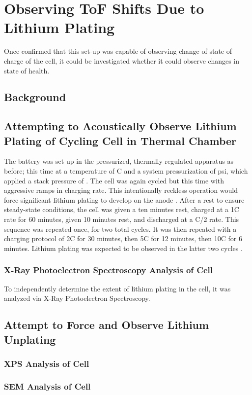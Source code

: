 \section{Observing ToF Shifts Due to Lithium Plating} 
Once confirmed that this set-up was capable of observing change of state of charge of the cell, it could be investigated whether it could observe changes in state of health.

\subsection{Background}

\subsection{Attempting to Acoustically Observe Lithium Plating of Cycling Cell in Thermal Chamber}
The battery was set-up in the pressurized, thermally-regulated apparatus as before; this time at a temperature of  C and a system pressurization of  psi, which applied a stack pressure of . 
The cell was again cycled but this time with aggressive ramps in charging rate. 
This intentionally reckless operation would force significant lithium plating to develop on the anode . 
After a rest to ensure steady-state conditions, the cell was given a ten minutes rest, charged at a 1C rate for 60 minutes, given 10 minutes rest, and discharged at a C/2 rate. 
This sequence was repeated once, for two total cycles. 
It was then repeated with a charging protocol of 2C for 30 minutes, then 5C for 12 minutes, then 10C for 6 minutes. 
Lithium plating was expected to be observed in the latter two cycles .
    
\subsubsection{X-Ray Photoelectron Spectroscopy Analysis of Cell}
    To independently determine the extent of lithium plating in the cell, it was analyzed via X-Ray Photoelectron Spectroscopy.

\subsection{Attempt to Force and Observe Lithium Unplating}

\subsubsection{XPS Analysis of Cell}

\subsubsection{SEM Analysis of Cell}